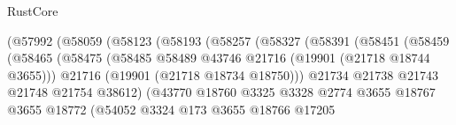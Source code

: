 \begin{lexlean}{RustCore}
\begin{coremodule}
                                          (@57992
                                            (@58059
                                              (@58123
                                                (@58193
                                                  (@58257
                                                    (@58327
                                                      (@58391
                                                        (@58451
                                                          (@58459
                                                            (@58465
                                                              (@58475
                                                                (@58485
                                                                  @58489
                                                                  @43746
                                                                  @21716
                                                                  (@19901 (@21718 @18744 @3655)))
                                                                @21716
                                                                (@19901 (@21718 @18734 @18750)))
                                                              @21734
                                                              @21738
                                                              @21743
                                                              @21748
                                                              @21754
                                                              @38612)
                                                            (@43770
                                                              @18760
                                                              @3325
                                                              @3328
                                                              @2774
                                                              @3655
                                                              @18767
                                                              @3655
                                                              @18772
                                                              (@54052
                                                                @3324
                                                                @173
                                                                @3655
                                                                @18766
                                                                @17205

\end{coremodule}
\end{lexlean}
